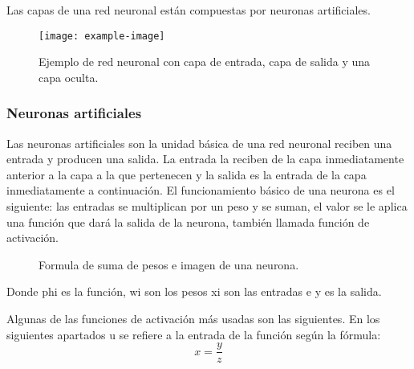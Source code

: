 \documentclass[12pt,a4paper]{article}
\begin{document}
Las capas de una red neuronal están compuestas por neuronas artificiales.

\begin{figure}[H]
\centering
\texttt{[image: example-image]}
\caption{Ejemplo de red neuronal con capa de entrada, capa de salida y una capa oculta.}
\end{figure}

\subsubsection{Neuronas artificiales}
Las neuronas artificiales son la unidad básica de una red neuronal reciben una entrada y producen una salida. La entrada la reciben de la capa inmediatamente anterior a la capa a la que pertenecen y la salida es la entrada de la capa inmediatamente a continuación. El funcionamiento básico de una neurona es el siguiente: las entradas se multiplican por un peso y se suman, el valor se le aplica una función que dará la salida de la neurona, también llamada función de activación.

\begin{figure}[H]
\centering
{}%
\qquad
{}%
\caption{Formula de suma de pesos e imagen de una neurona.}
\end{figure}

Donde phi es la función, wi son los pesos xi son las entradas e y es la salida.
\bigskip

Algunas de las funciones de activación más usadas son las siguientes. En los siguientes apartados u se refiere a la entrada de la función según la fórmula:
\begin{equation}
x = \frac{y}{z}
\end{equation}
\end{document}
